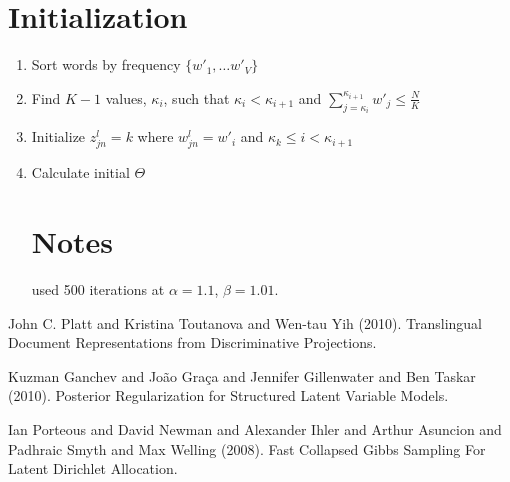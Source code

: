 \documentclass[a4paper,10pt]{article}
\begin{document}
\section{Initialization}

\begin{enumerate}
 \item Sort words by frequency $\{w'_1,\ldots w'_V\}$
 \item Find $K-1$ values, $\kappa_i$, such that $\kappa_i < \kappa_{i+1}$ and
   $\sum_{j = \kappa_i}^{\kappa_{i+1}} w'_j \leq \frac{N}{K}$
 \item Initialize $z^l_{jn} = k$ where $w^l_{jn} = w'_i$ and $\kappa_k \leq i <
\kappa_{i+1}$
 \item Calculate initial $\Theta$
 
\section{Notes}

\cite{platt} used 500 iterations at $\alpha=1.1$, $\beta=1.01$.
 
\end{enumerate}






\begin{thebibliography}{9}

John C. Platt and Kristina Toutanova and Wen-tau Yih (2010).
Translingual Document Representations from Discriminative Projections.

Kuzman Ganchev and João Graça and Jennifer Gillenwater and Ben Taskar (2010).
Posterior Regularization for Structured Latent Variable Models.

Ian Porteous and David Newman and Alexander Ihler and Arthur Asuncion
and Padhraic Smyth and Max Welling (2008).
Fast Collapsed Gibbs Sampling For Latent Dirichlet Allocation.

\end{thebibliography}
\end{document}
